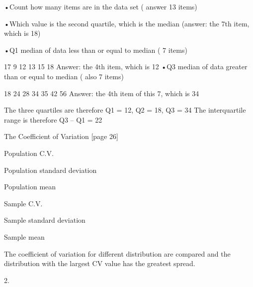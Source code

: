 \documentclass[]{report}
\begin{document}
•Count how many items are in the data set ( answer 13 items)

•Which value is the second quartile, which is the median (answer: the 7th item, which is 18)

•Q1  median of data less than or equal to median ( 7 items)

17  9 12 13 15 18 
 Answer: the 4th item, which is 12
•Q3  median of data greater than or equal to median ( also 7 items)

18  24 28 34 35 42 56 
Answer: the 4th item of this 7, which is 34

The three quartiles are therefore Q1 = 12, Q2 = 18, Q3 = 34
The interquartile range is therefore Q3 – Q1 = 22

 


The Coefficient of Variation [page 26]

Population C.V.
 
 

   Population standard deviation

  Population mean


Sample C.V.

 

     Sample standard deviation 

    Sample mean
 


 
The coefficient of variation for different distribution are compared and the distribution with the largest CV value has the greatest spread.
 




2. 
\end{document}
